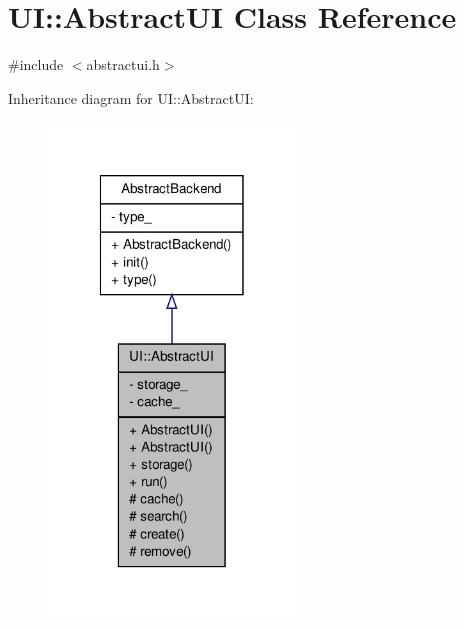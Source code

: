\hypertarget{classUI_1_1AbstractUI}{
\section{UI::AbstractUI Class Reference}
\label{de/dda/classUI_1_1AbstractUI}
}


{\ttfamily \#include $<$abstractui.h$>$}



Inheritance diagram for UI::AbstractUI:
\nopagebreak
\begin{figure}[H]
\begin{center}
\leavevmode
\includegraphics[width=186pt]{de/d4d/classUI_1_1AbstractUI__inherit__graph}
\end{center}
\end{figure}


